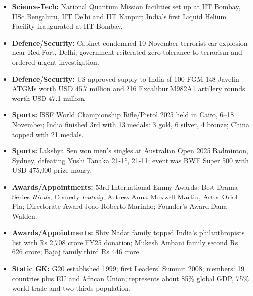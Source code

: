\documentclass[10pt,a4paper]{article}
\begin{document}
\begin{itemize}
    \item \textbf{Science-Tech:} National Quantum Mission facilities set up at IIT Bombay, IISc Bengaluru, IIT Delhi and IIT Kanpur; India's first Liquid Helium Facility inaugurated at IIT Bombay.
    \item \textbf{Defence/Security:} Cabinet condemned 10 November terrorist car explosion near Red Fort, Delhi; government reiterated zero tolerance to terrorism and ordered urgent investigation.
    \item \textbf{Defence/Security:} US approved supply to India of 100 FGM-148 Javelin ATGMs worth USD 45.7 million and 216 Excalibur M982A1 artillery rounds worth USD 47.1 million.
    \item \textbf{Sports:} ISSF World Championship Rifle/Pistol 2025 held in Cairo, 6--18 November; India finished 3rd with 13 medals: 3 gold, 6 silver, 4 bronze; China topped with 21 medals.
    \item \textbf{Sports:} Lakshya Sen won men's singles at Australian Open 2025 Badminton, Sydney, defeating Yushi Tanaka 21-15, 21-11; event was BWF Super 500 with USD 475,000 prize money.
    \item \textbf{Awards/Appointments:} 53rd International Emmy Awards: Best Drama Series \textit{Rivals}; Comedy \textit{Ludwig}; Actress Anna Maxwell Martin; Actor Oriol Pla; Directorate Award Joao Roberto Marinho; Founder's Award Dana Walden.
    \item \textbf{Awards/Appointments:} Shiv Nadar family topped India's philanthropists list with Rs 2,708 crore FY25 donation; Mukesh Ambani family second Rs 626 crore; Bajaj family third Rs 446 crore.
    \item \textbf{Static GK:} G20 established 1999; first Leaders' Summit 2008; members: 19 countries plus EU and African Union; represents about 85\% global GDP, 75\% world trade and two-thirds population.
\end{itemize}
\end{document}
